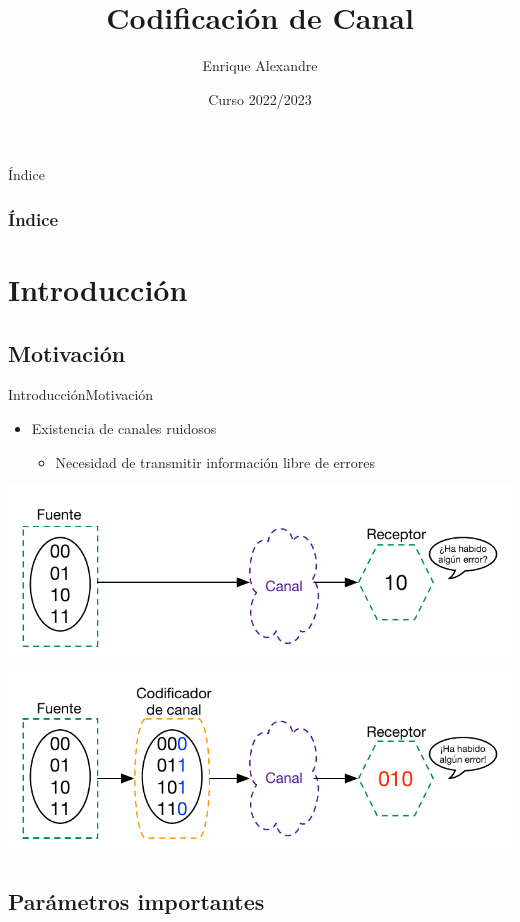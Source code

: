 \documentclass[10pt,compress]{beamer} %
\title[Codificación de Canal]{Codificación de Canal}
\author{Enrique Alexandre}
\institute{Dpto. de Teoría de la Señal y Comunicaciones}
\date{Curso 2022/2023}
\begin{document}
{\titlepageBlue
    \begin{frame}
        \titlepage
    \end{frame}
}

{
\begin{frame}[shrink]{Índice}
 \frametitle{Índice}
 \tableofcontents
\end{frame}
}

\section{Introducción}

\subsection{Motivación}

\begin{frame}{Introducción}{Motivación}
    \begin{itemize}
		\item Existencia de canales ruidosos
		\begin{itemize}
			\item Necesidad de transmitir información libre de errores
		\end{itemize}
	\end{itemize}
	\centering \includegraphics[width=0.7\linewidth]{../Apuntes/Figuras/CodificacionDeCanal1.pdf}
	\centering \includegraphics[width=0.7\linewidth]{../Apuntes/Figuras/CodificacionDeCanal2.pdf}
\end{frame}

\subsection{Parámetros importantes}
\end{document}
